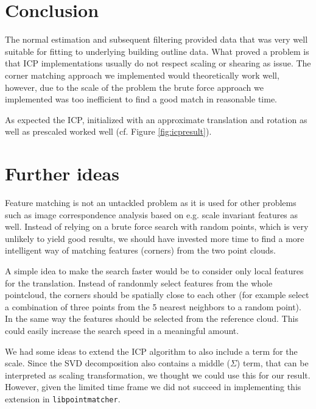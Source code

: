 \documentclass[10pt,twocolumn,letterpaper]{article}
\begin{document}
\section{Conclusion}

The normal estimation and subsequent filtering provided data that was very well suitable for fitting to underlying building outline data. 
What proved a problem is that ICP implementations usually do not respect scaling or shearing as issue. The corner matching approach we implemented would theoretically work well, however, due to the scale of the problem the brute force approach we implemented was too inefficient to find a good match in reasonable time. 

As expected the ICP, initialized with an approximate translation and rotation as well as prescaled worked well (cf. Figure \ref{fig:icpresult}).

\section{Further ideas}

Feature matching is not an untackled problem as it is used for other problems such as image correspondence analysis based on e.g. scale invariant features as well. Instead of relying on a brute force search with random points, which is very unlikely to yield good results, we should have invested more time to find a more intelligent way of matching features (corners) from the two point clouds.

A simple idea to make the search faster would be to consider only local features for the translation. Instead of randonmly select features from the whole pointcloud, the corners should be spatially close to each other (for example select a combination of three points from the 5 nearest neighbors to a random point). In the same way the features should be selected from the reference cloud. This could easily increase the search speed in a meaningful amount.

We had some ideas to extend the ICP algorithm to also include a term for the scale. Since the SVD decomposition also contains a middle ($\Sigma$) term, that can be interpreted as scaling transformation, we thought we could use this for our result.
However, given the limited time frame we did not succeed in implementing this extension in \texttt{libpointmatcher}.


{\small


}
\end{document}
